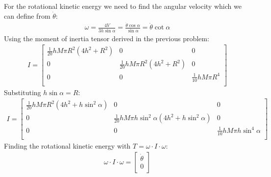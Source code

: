\documentclass[10pt]{article}
\begin{document}
\begin{enumerate}
        For the rotational kinetic energy we need to find the angular velocity which we can define from $\dot{\theta}$:
        \begin{gather*}
            \omega=\frac{4V}{3h\sin\alpha}=\frac{\dot{\theta}\cos\alpha}{\sin\alpha}=\dot{\theta}\cot\alpha
        \end{gather*}
        Using the moment of inertia tensor derived in the previous problem:
        \begin{gather*}
            I=
            \begin{bmatrix}
                \frac{1}{20} h M \pi  R^2 \left(4 h^2+R^2\right) & 0                                              & 0                       \\
                0                                              & \frac{1}{20} h M \pi  R^2 \left(4 h^2+R^2\right) & 0                       \\
                0                                              & 0                                              & \frac{1}{10} h M \pi  R^4 \\
            \end{bmatrix}
        \end{gather*}
        Substituting $h\sin\alpha=R$:
        \begin{gather*}
            I=
            \begin{bmatrix}
                \frac{1}{20} h M \pi  R^2 \left(4 h^2+h\sin^2\alpha\right) & 0                                                                  & 0                                 \\
                0                                                        & \frac{1}{20} h M \pi  h\sin^2\alpha \left(4 h^2+h\sin^2\alpha\right) & 0                                 \\
                0                                                        & 0                                                                  & \frac{1}{10} h M \pi  h\sin^4\alpha \\
            \end{bmatrix}
        \end{gather*}
        Finding the rotational kinetic energy with $T=\omega\cdot I\cdot\omega$:
        \begin{gather*}
            \omega\cdot I\cdot\omega=
            \begin{bmatrix}
                \dot{\theta} \\
                0            \\

\end{bmatrix}
\end{gather*}
\end{enumerate}
\end{document}
